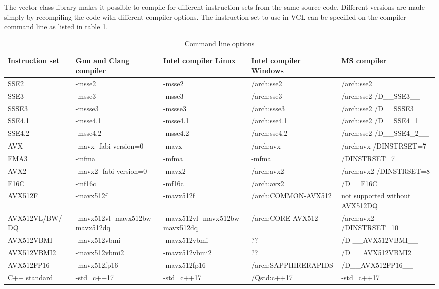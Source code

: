 \documentclass[vcl_manual.tex]{subfiles}
\begin{document}
The vector class library makes it possible to compile for different instruction sets from the same source code. Different versions are made simply by recompiling the code with different compiler options. The instruction set to use in VCL can be specified on the compiler command line as listed in table \ref{table:CommandLineOptions}.

\begin {table}[h]
\caption{Command line options}
\label{table:CommandLineOptions}
\begin{tabular}{|p{26mm}|p{28mm}|p{28mm}|p{28mm}|p{28mm}|}
\hline
\bfseries Instruction set & \bfseries Gnu and Clang compiler & \bfseries Intel compiler Linux & \bfseries Intel compiler Windows & \bfseries MS compiler \\ \hline

SSE2 & -msse2 & -msse2 & /arch:sse2 & /arch:sse2 \\ \hline
SSE3 & -msse3 & -msse3 & /arch:sse3 & /arch:sse2 \newline /D\_\_SSE3\_\_ \\ \hline
SSSE3 & -mssse3 & -mssse3 & /arch:ssse3 & /arch:sse2 \newline /D\_\_SSSE3\_\_ \\ \hline
SSE4.1 & -msse4.1 & -msse4.1 & /arch:sse4.1 & /arch:sse2 \newline /D\_\_SSE4\_1\_\_ \\ \hline
SSE4.2 & -msse4.2 & -msse4.2 & /arch:sse4.2 & /arch:sse2 \newline /D\_\_SSE4\_2\_\_ \\ \hline
AVX & -mavx \newline -fabi-version=0 & -mavx & /arch:avx & /arch:avx /DINSTRSET=7 \\ \hline
FMA3 & -mfma & -mfma & -mfma & /DINSTRSET=7 \\ \hline
AVX2 & -mavx2 \newline -fabi-version=0 & -mavx2 & /arch:avx2 & /arch:avx2 \newline /DINSTRSET=8 \\ \hline
F16C & -mf16c & -mf16c & /arch:avx2 & /D\_\_F16C\_\_ \\ \hline
AVX512F & -mavx512f & -mavx512f & /arch:COMMON-AVX512 & not supported without AVX512DQ\\ \hline
AVX512VL/BW/ DQ & -mavx512vl -mavx512bw -mavx512dq & -mavx512vl -mavx512bw -mavx512dq & /arch:CORE-AVX512 & /arch:avx2 /DINSTRSET=10 \\ \hline
AVX512VBMI & -mavx512vbmi & -mavx512vbmi & ?? & /D \_\_AVX512VBMI\_\_ \\ \hline
AVX512VBMI2 & -mavx512vbmi2 & -mavx512vbmi2 & ?? & /D \_\_AVX512VBMI2\_\_ \\ \hline
AVX512FP16 & -mavx512fp16 & -mavx512fp16 & /arch:SAPPHIRERAPIDS & /D\_\_AVX512FP16\_\_ \\ \hline
C++ standard & -std=c++17 & -std=c++17 & /Qstd:c++17 & -std=c++17 \\ \hline
\end{tabular}
\end{table}
\end{document}
